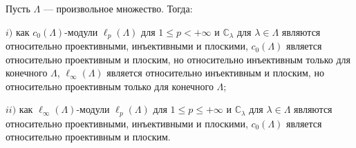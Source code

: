 \begin{proposition}\label{c0AndlInftyModsRelTh} Пусть $\Lambda$ --- произвольное множество. Тогда:

$i)$ как $c_0(\Lambda)$-модули $\ell_p(\Lambda)$ для $1\leq p<+\infty$ и $\mathbb{C}_\lambda$ для $\lambda\in\Lambda$ являются относительно проективными, инъективными и плоскими, $c_0(\Lambda)$ является относительно проективным и плоским, но относительно инъективным только для конечного $\Lambda$, $\ell_\infty(\Lambda)$ является относительно инъективным и плоским, но относительно проективным только для конечного $\Lambda$;

$ii)$ как $\ell_\infty(\Lambda)$-модули $\ell_p(\Lambda)$ для $1\leq p\leq+\infty$ и $\mathbb{C}_\lambda$ для $\lambda\in\Lambda$ являются относительно проективными, инъективными и плоскими, $c_0(\Lambda)$ является относительно проективным и плоским.
\end{proposition}
